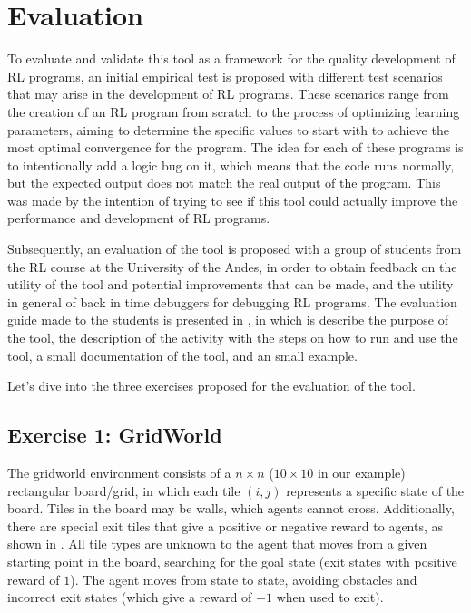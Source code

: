 
\chapter{Evaluation}
\label{cha:evaluation}

To evaluate and validate this tool as a framework for the quality development 
of \ac{RL} programs, an initial empirical test is proposed with different test scenarios 
that may arise in the development of \ac{RL} programs. These scenarios range from 
the creation of an \ac{RL} program from scratch to the process of optimizing 
learning parameters, aiming to determine the specific values to start with 
to achieve the most optimal convergence for the program. The idea for each of these 
programs is to intentionally add a logic bug on it, which means that the code runs 
normally, but the expected output does not match the real output of the program. 
This was made by the intention of trying to see if this tool could actually improve the 
performance and development of \ac{RL} programs.

Subsequently, an evaluation of the tool is proposed with a group of students 
from the \ac{RL} course at the University of the Andes, in order to obtain 
feedback on the utility of the tool and potential improvements that can be made, 
and the utility in general of back in time debuggers for debugging \ac{RL} programs.
The evaluation guide made to the students is presented in , in which 
is describe the purpose of the tool, the description of the activity with the steps on how to run and 
use the tool, a small documentation of the tool, and an small example.

Let's dive into the three exercises proposed for the evaluation of the tool. 

\section{Exercise 1: GridWorld}

The gridworld environment consists of a $n\times n$ ($10\times 10$ in our example) rectangular 
board/grid, in which each tile $(i,j)$ represents a specific state of the board. Tiles in the board may be 
walls, which agents cannot cross. Additionally, there are special exit 
tiles that give a positive or negative reward to agents, as shown in . All tile types 
are unknown to the agent that moves from a given starting point in the board, searching for the goal 
state (\ie exit states with positive reward of $1$). The agent moves from state to state, avoiding 
obstacles and incorrect exit states (which give a reward of $-1$ when used to exit). 

